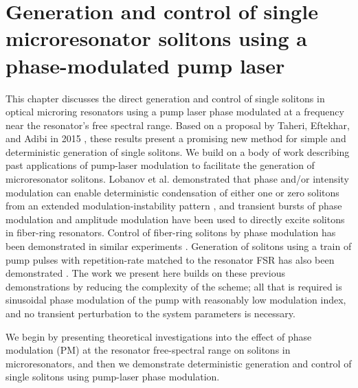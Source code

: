  \chapter{Generation and control of single microresonator solitons using a phase-modulated pump laser} \label{chap:PMPumping}

This chapter discusses the direct generation and control of single solitons in optical microring resonators using a pump laser phase modulated at a frequency near the resonator's free spectral range. Based on a proposal by Taheri, Eftekhar, and Adibi in 2015 \cite{Taheri2015}, these results present a promising new method for simple and deterministic generation of single solitons. We build on a body of work describing past applications of pump-laser modulation to facilitate the generation of microresonator solitons. Lobanov et al. demonstrated that phase and/or intensity modulation can enable deterministic condensation of either one or zero solitons from an extended modulation-instability pattern \cite{Lobanov2016}, and transient bursts of phase modulation \cite{Jang2015} and amplitude modulation \cite{Wang2018} have been used to directly excite solitons in fiber-ring resonators. Control of fiber-ring solitons by phase modulation has been demonstrated in similar experiments \cite{Jang2015a}. Generation of solitons using a train of pump pulses with repetition-rate matched to the resonator FSR has also been demonstrated \cite{Obrzud2017}. The work we present here builds on these previous demonstrations by reducing the complexity of the scheme; all that is required is sinusoidal phase modulation of the pump with reasonably low modulation index, and no transient perturbation to the system parameters is necessary.

We begin by presenting theoretical investigations into the effect of phase modulation (PM) at the resonator free-spectral range on solitons in microresonators, and then we demonstrate deterministic generation and control of single solitons using pump-laser phase modulation.




